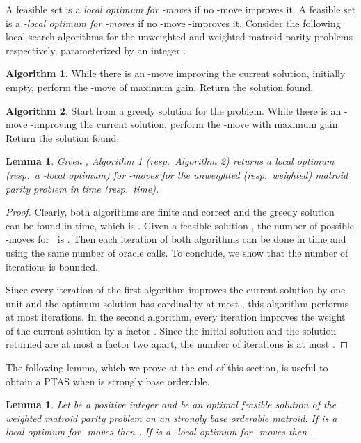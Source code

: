 \documentclass[letterpaper,11pt]{article}
\newtheorem{lemma}[theorem]{Lemma}
\theoremstyle{definition}
\newtheorem{alg}{Algorithm}
\begin{document}
A feasible set is a \emph{local optimum for -moves} if no -move improves it. A feasible set is a \emph{-local optimum for -moves} if no -move -improves it. Consider the following local search algorithms for the unweighted and weighted matroid parity problems respectively, parameterized by an integer .

\begin{alg} \label{alg1} While there is an -move improving the current solution, initially empty, perform the -move of maximum gain. Return the solution found.
\end{alg}

\begin{alg} \label{alg2} Start from a greedy solution  for the problem. While there is an -move -improving the current solution, perform the -move with maximum gain. Return the solution found.
\end{alg}
\begin{lemma}\label{lem:localoptimum}
Given , Algorithm \ref{alg1} (resp.\ Algorithm \ref{alg2}) returns a local optimum (resp.\ a -local optimum) for -moves for the unweighted (resp.\ weighted) matroid parity problem in  time (resp.\  time).
\end{lemma}
\begin{proof}
Clearly, both algorithms are finite and correct and the greedy solution~ can be found in  time, which is . Given a feasible solution , the number of possible -moves for~ is . Then each iteration of both algorithms can be done in  time and using the same number of oracle calls. To conclude, we show that the number of iterations is bounded.

Since every iteration of the first algorithm improves the current solution by one unit and the optimum solution has cardinality at most , this algorithm performs at most  iterations. In the second algorithm, every iteration improves the weight of the current solution by a factor . Since the initial solution  and the solution returned are at most a factor two apart, the number of iterations is at most . \qedhere
\end{proof}

The following lemma, which we prove at the end of this section, is useful to obtain a PTAS when  is strongly base orderable.

\begin{lemma}\label{lem:main}
Let  be a positive integer and  be an optimal feasible solution of the weighted matroid parity problem on an strongly base orderable matroid.
If  is a local optimum for -moves then .
If  is a -local optimum for -moves then .
\end{lemma}
\end{document}
